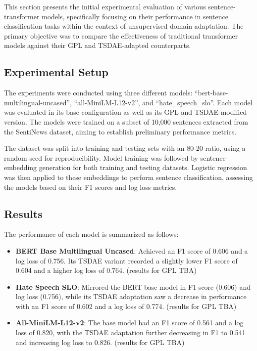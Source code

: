 \documentclass[fleqn,moreauthors,10pt]{ds_report}
\begin{document}
This section presents the initial experimental evaluation of various sentence-transformer models, specifically focusing on their performance in sentence classification tasks within the context of unsupervised domain adaptation. The primary objective was to compare the effectiveness of traditional transformer models against their GPL and TSDAE-adapted counterparts.



\subsection*{Experimental Setup}

The experiments were conducted using three different models: ``bert-base-multilingual-uncased'', ``all-MiniLM-L12-v2'', and ``hate\_speech\_slo''. Each model was evaluated in its base configuration as well as its GPL and TSDAE-modified version. The models were trained on a subset of 10,000 sentences extracted from the SentiNews dataset, aiming to establish preliminary performance metrics.

The dataset was split into training and testing sets with an 80-20 ratio, using a random seed for reproducibility. Model training was followed by sentence embedding generation for both training and testing datasets. Logistic regression was then applied to these embeddings to perform sentence classification, assessing the models based on their F1 scores and log loss metrics.

\subsection*{Results}
The performance of each model is summarized as follows:

\begin{itemize}
    \item \textbf{BERT Base Multilingual Uncased}: Achieved an F1 score of 0.606 and a log loss of 0.756. Its TSDAE variant recorded a slightly lower F1 score of 0.604 and a higher log loss of 0.764. (results for GPL TBA)
    \item \textbf{Hate Speech SLO}: Mirrored the BERT base model in F1 score (0.606) and log loss (0.756), while its TSDAE adaptation saw a decrease in performance with an F1 score of 0.602 and a log loss of 0.774. (results for GPL TBA)
    \item \textbf{All-MiniLM-L12-v2}: The base model had an F1 score of 0.561 and a log loss of 0.820, with the TSDAE adaptation further decreasing in F1 to 0.541 and increasing log loss to 0.826. (results for GPL TBA)
\end{itemize}
\end{document}

